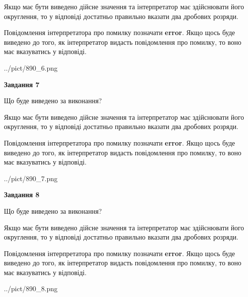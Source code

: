 \documentclass[12pt, ukrainian]{article}
\begin{document}
{\begin {Large}
Якщо має бути виведено дійсне значення та інтерпретатор має здійснювати його округлення, 
то у відповіді достатньо правильно вказати два дробових розряди.

Повідомлення інтерпретатора про помилку позначати \textbf{error}.
Якщо щось буде виведено до того, як інтерпретатор видасть повідомлення про помилку, 
то воно має вказуватись у відповіді. \par

\begin{center}
	{../pict/890_6.png}
\end{center}
\newpage

{\begin {center}\textbf{Завдання 7}\end {center}}\par
Що буде виведено за виконання? \par

Якщо має бути виведено дійсне значення та інтерпретатор має здійснювати його округлення, 
то у відповіді достатньо правильно вказати два дробових розряди.

Повідомлення інтерпретатора про помилку позначати \textbf{error}.
Якщо щось буде виведено до того, як інтерпретатор видасть повідомлення про помилку, 
то воно має вказуватись у відповіді. \par

\begin{center}
	{../pict/890_7.png}
\end{center}
\newpage

{\begin {center}\textbf{Завдання 8}\end {center}}\par
Що буде виведено за виконання? \par

Якщо має бути виведено дійсне значення та інтерпретатор має здійснювати його округлення, 
то у відповіді достатньо правильно вказати два дробових розряди.

Повідомлення інтерпретатора про помилку позначати \textbf{error}.
Якщо щось буде виведено до того, як інтерпретатор видасть повідомлення про помилку, 
то воно має вказуватись у відповіді. \par

\begin{center}
	{../pict/890_8.png}
\end{center}
\newpage


\end{Large}}
\end{document}
